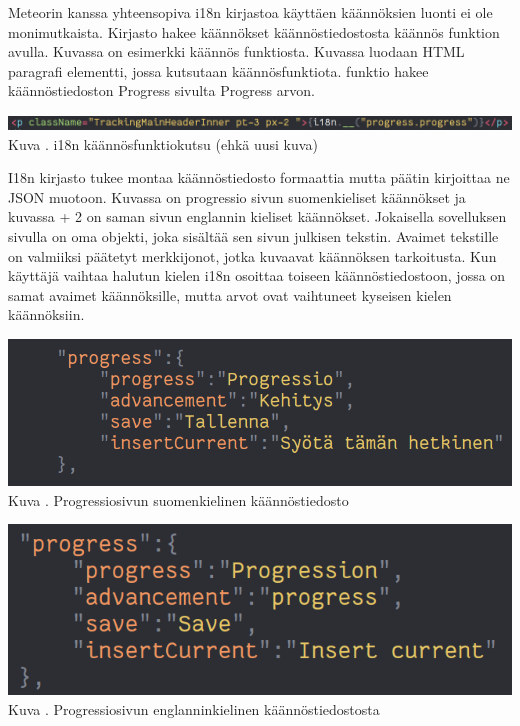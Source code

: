 \documentclass[11pt,a4paper,titlepage,oneside]{article}
\begin{document}

Meteorin kanssa yhteensopiva i18n kirjastoa käyttäen käännöksien luonti ei ole monimutkaista.
Kirjasto hakee käännökset käännöstiedostosta käännös funktion avulla.
Kuvassa \nextImageCount{} on esimerkki käännös funktiosta.
Kuvassa luodaan HTML paragrafi elementti, jossa kutsutaan käännösfunktiota. 
funktio hakee käännöstiedoston Progress sivulta Progress arvon.\\
\medskip

\bigskip
\includegraphics[width = 15cm]{src/public/oppar/translationcall.png}\\
Kuva \getImgCount. {} i18n käännösfunktiokutsu (ehkä uusi kuva)
\medskip



I18n kirjasto tukee montaa käännöstiedosto formaattia mutta päätin kirjoittaa ne JSON muotoon. %
Kuvassa \nextImageCount{} on progressio sivun suomenkieliset käännökset ja kuvassa {\the\numexpr \theimgCounter + 2 } on saman sivun englannin kieliset käännökset.
Jokaisella sovelluksen sivulla on oma objekti, joka sisältää sen sivun julkisen tekstin. 
Avaimet tekstille on valmiiksi päätetyt merkkijonot, jotka kuvaavat käännöksen tarkoitusta.
Kun käyttäjä vaihtaa halutun kielen i18n osoittaa toiseen käännöstiedostoon, 
jossa on samat avaimet käännöksille, mutta arvot ovat vaihtuneet kyseisen kielen käännöksiin.
\medskip


\bigskip
\includegraphics[width = 15cm]{src/public/oppar/translationfile.png}\\
Kuva \getImgCount. {} Progressiosivun suomenkielinen käännöstiedosto 
\medskip


\bigskip
\includegraphics[width = 15cm]{src/public/oppar/translationfileEng.png}\\
Kuva \getImgCount {}. Progressiosivun englanninkielinen käännöstiedostosta
\medskip
\end{document}
